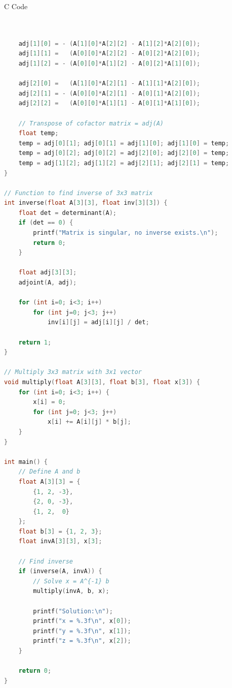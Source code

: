 \documentclass{beamer}
\begin{document}
\begin{frame}[fragile]{C Code}
\begin{lstlisting}[language=C]


    adj[1][0] = - (A[1][0]*A[2][2] - A[1][2]*A[2][0]);
    adj[1][1] =   (A[0][0]*A[2][2] - A[0][2]*A[2][0]);
    adj[1][2] = - (A[0][0]*A[1][2] - A[0][2]*A[1][0]);

    adj[2][0] =   (A[1][0]*A[2][1] - A[1][1]*A[2][0]);
    adj[2][1] = - (A[0][0]*A[2][1] - A[0][1]*A[2][0]);
    adj[2][2] =   (A[0][0]*A[1][1] - A[0][1]*A[1][0]);

    // Transpose of cofactor matrix = adj(A)
    float temp;
    temp = adj[0][1]; adj[0][1] = adj[1][0]; adj[1][0] = temp;
    temp = adj[0][2]; adj[0][2] = adj[2][0]; adj[2][0] = temp;
    temp = adj[1][2]; adj[1][2] = adj[2][1]; adj[2][1] = temp;
}

// Function to find inverse of 3x3 matrix
int inverse(float A[3][3], float inv[3][3]) {
    float det = determinant(A);
    if (det == 0) {
        printf("Matrix is singular, no inverse exists.\n");
        return 0;
    }

    float adj[3][3];
    adjoint(A, adj);

    for (int i=0; i<3; i++)
        for (int j=0; j<3; j++)
            inv[i][j] = adj[i][j] / det;

    return 1;
}

// Multiply 3x3 matrix with 3x1 vector
void multiply(float A[3][3], float b[3], float x[3]) {
    for (int i=0; i<3; i++) {
        x[i] = 0;
        for (int j=0; j<3; j++)
            x[i] += A[i][j] * b[j];
    }
}

int main() {
    // Define A and b
    float A[3][3] = {
        {1, 2, -3},
        {2, 0, -3},
        {1, 2,  0}
    };
    float b[3] = {1, 2, 3};
    float invA[3][3], x[3];

    // Find inverse
    if (inverse(A, invA)) {
        // Solve x = A^{-1} b
        multiply(invA, b, x);

        printf("Solution:\n");
        printf("x = %.3f\n", x[0]);
        printf("y = %.3f\n", x[1]);
        printf("z = %.3f\n", x[2]);
    }

    return 0;
}
\end{lstlisting}
\end{frame}
\end{document}
